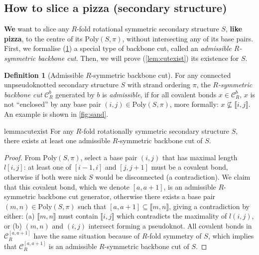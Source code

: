 \documentclass[11pt,letterpaper]{article}  \usepackage[margin=1in]{geometry}
\theoremstyle{definition}  \newtheorem{Definition}[theorem]{Definition}
\newcommand{\PolySpi}{\ensuremath{\mathrm{Poly}(S,\pi)}\xspace}
\begin{document}
\subsection{How to slice a pizza (secondary structure)}

{\bf We} want to slice any $R$-fold rotational symmetric secondary structure $S$, {\bf like pizza}, to the centre of its $\PolySpi$, without intersecting any of its base pairs. First, we formalise (\cref{def:admissible}) a special type of backbone cut, called an \emph{admissible  $R$-symmetric backbone cut}. Then, we will prove (\cref{lem:cutexist}) its existence for $S$. 

\begin{Definition}[Admissible $R$-symmetric backbone cut] \label{def:admissible}
	For any connected unpseudoknotted secondary structure $S$ with strand ordering $\pi$, the {\em $R$-symmetric backbone cut} $\mathcal{C}_R^b$ generated by $b$ is {\em admissible}, 
	if for all covalent bonds $x \in \mathcal{C}_R^b$,  
	$x$ is not ``enclosed'' by any base pair $(i,j) \in \PolySpi$, more formally:  $x \nsubseteq \llbracket i,j \rrbracket$.   An example is shown in \cref{fig:sand}.
\end{Definition}


\begin{restatable}{lemma}{cutexist} 
	\label{lem:cutexist}
	For any $R$-fold rotationally symmetric secondary structure $S$, there exists at least one admissible $R$-symmetric backbone cut of $S$.
\end{restatable}
\begin{proof}
	From $\PolySpi$, select  a base pair $(i,j)$ that has maximal length $l[i,j]$: 
	at least one of $[i-1,i]$ and $[j,j+1]$ must be a covalent bond, otherwise if both were nick $S$ would be disconnected (a contradiction). 
	We claim that this covalent bond, which we denote $[a,a+1]$, 
	is an admissible $R$-symmetric backbone cut generator, otherwise there exists a base pair $(m,n) \in \PolySpi$ such that $[a,a+1] \subseteq \llbracket m,n \rrbracket$, 
	giving a contradiction by either: 
	(a) 
	$\llbracket m,n \rrbracket$ must contain $\llbracket i,j \rrbracket$ which contradicts the maximality of $l( i,j )$, 
	or (b) $( m,n )$ and $( i,j )$ intersect forming a pseudoknot. 
	All covalent bonds in $\mathcal{C}_R^{[a,a+1]}$  have the same situation because of $R$-fold symmetry of $S$, 
	which implies that $\mathcal{C}_R^{[a,a+1]}$ is an admissible $R$-symmetric backbone cut of $S$.
\end{proof}
\end{document}
